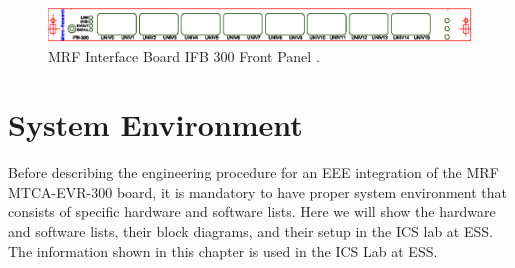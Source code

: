 \documentclass[11pt
  , a4paper
  , article
  , oneside
  , showtrims
]{memoir}
\begin{document}
\begin{figure}[!htb]
  \centering
  \includegraphics{./pictures/ifb-300.eps}
  \caption{
    MRF Interface Board IFB 300 Front Panel \cite{MRFEVENTSYSTEMDC}.
  }
  \label{fig:ifb-300}   
\end{figure}


\clearpage

\chapter{System Environment}
Before describing the engineering procedure for an EEE integration of the MRF MTCA-EVR-300 board, it is mandatory to have proper system environment that consists of specific hardware and software lists. Here we will show the hardware and software lists, their block diagrams, and their setup in the ICS lab at ESS. The information shown in this chapter is used in the ICS Lab at ESS.
\end{document}
